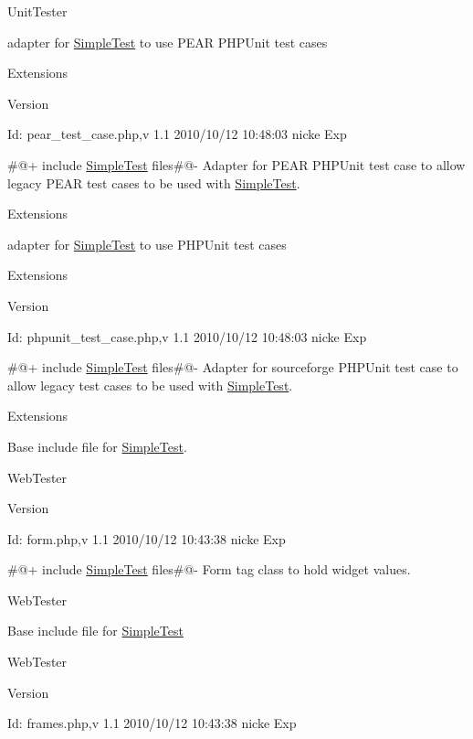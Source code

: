 UnitTester

adapter for \hyperlink{class_simple_test}{SimpleTest} to use PEAR PHPUnit test cases

Extensions \begin{DoxyVersion}{Version}

\end{DoxyVersion}
\begin{DoxyParagraph}{Id:}
pear\_\-test\_\-case.php,v 1.1 2010/10/12 10:48:03 nicke Exp 
\end{DoxyParagraph}


\#@+ include \hyperlink{class_simple_test}{SimpleTest} files\#@-\/ Adapter for PEAR PHPUnit test case to allow legacy PEAR test cases to be used with \hyperlink{class_simple_test}{SimpleTest}.

Extensions

adapter for \hyperlink{class_simple_test}{SimpleTest} to use PHPUnit test cases

Extensions \begin{DoxyVersion}{Version}

\end{DoxyVersion}
\begin{DoxyParagraph}{Id:}
phpunit\_\-test\_\-case.php,v 1.1 2010/10/12 10:48:03 nicke Exp 
\end{DoxyParagraph}


\#@+ include \hyperlink{class_simple_test}{SimpleTest} files\#@-\/ Adapter for sourceforge PHPUnit test case to allow legacy test cases to be used with \hyperlink{class_simple_test}{SimpleTest}.

Extensions

Base include file for \hyperlink{class_simple_test}{SimpleTest}.

WebTester \begin{DoxyVersion}{Version}

\end{DoxyVersion}
\begin{DoxyParagraph}{Id:}
form.php,v 1.1 2010/10/12 10:43:38 nicke Exp 
\end{DoxyParagraph}


\#@+ include \hyperlink{class_simple_test}{SimpleTest} files\#@-\/ Form tag class to hold widget values.

WebTester

Base include file for \hyperlink{class_simple_test}{SimpleTest}

WebTester \begin{DoxyVersion}{Version}

\end{DoxyVersion}
\begin{DoxyParagraph}{Id:}
frames.php,v 1.1 2010/10/12 10:43:38 nicke Exp 
\end{DoxyParagraph}


